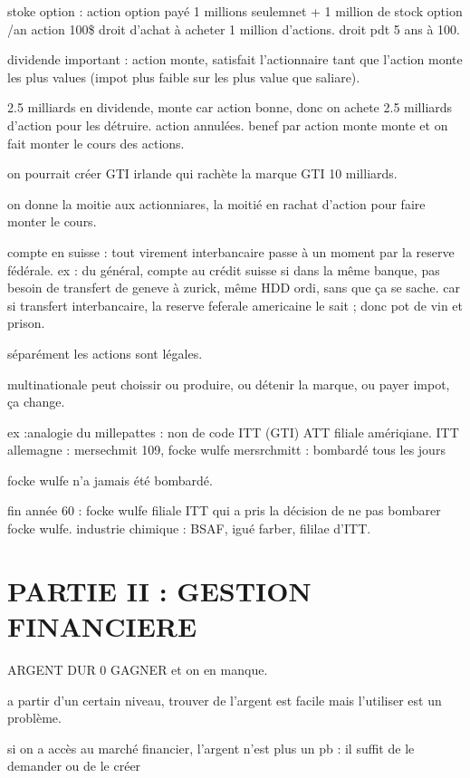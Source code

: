 \documentclass[a4paper,12pt]{article}
\begin{document}
stoke option : action option payé 1 millions seulemnet + 1 million de stock option /an
action 100\$  droit d'achat à acheter 1 million d'actions. droit pdt 5 ans à 100.

dividende important : action monte, satisfait l'actionnaire
tant que l'action monte les plus values (impot plus faible sur les plus value que saliare).

2.5 milliards en dividende, monte car action bonne, donc on achete 2.5 milliards d'action pour les détruire.
action annulées. benef par action monte monte et on fait monter le cours des actions.


on pourrait créer GTI irlande qui rachète la marque GTI 10 milliards.

on donne la moitie aux actionniares, la moitié en rachat d'action pour faire monter le cours.

compte en suisse : tout virement interbancaire passe à un moment par la reserve fédérale.
ex : du général, compte au crédit suisse 
si dans la même banque, pas besoin de transfert de geneve à zurick, même HDD ordi, sans que ça se sache.
car si transfert interbancaire, la reserve feferale americaine le sait ; donc pot de vin et prison.


séparément les actions sont légales.

multinationale peut choissir ou produire, ou détenir la marque, ou payer impot, ça change.

ex :analogie du millepattes  : non de code ITT (GTI)  ATT filiale amériqiane.
ITT allemagne : mersechmit 109, focke wulfe
mersrchmitt : bombardé tous les jours

focke wulfe n'a jamais été bombardé.

fin année 60 : focke wulfe filiale ITT
qui a pris la décision de ne pas bombarer focke wulfe.
industrie chimique : BSAF, igué farber, fililae d'ITT.




\section{PARTIE II : GESTION FINANCIERE}
  ARGENT DUR 0 GAGNER et on en manque.
  
  a partir d'un certain niveau, trouver de l'argent est facile mais l'utiliser est un problème.
  
  si on a accès au marché financier, l'argent n'est plus un pb : il suffit de le demander ou de le créer
  
  
 
\end{document}
